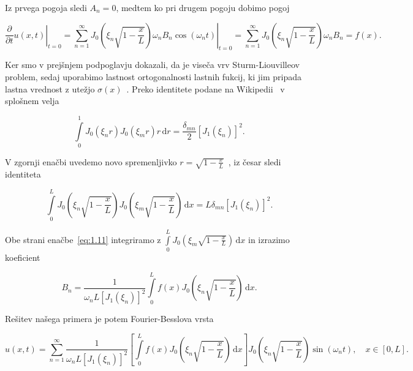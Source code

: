 Iz prvega pogoja sledi \( A_n = 0 \), medtem ko pri drugem pogoju dobimo pogoj

\begin{equation}
\label{eq:1.11}
 \left. \frac{\partial }{\partial t} u(x, t)\right|_{t = 0} = \left. \sum\limits_{n = 1}^{\infty} J_0 \left( \xi_n \sqrt{1 - \frac{x}{L}} \right) \omega_n B_n \cos \left( \omega_n t \right) \right|_{t= 0} = \sum\limits_{n = 1}^{\infty} J_0 \left( \xi_n \sqrt{1 - \frac{x}{L}} \right) \omega_n B_n = f(x).
\end{equation}

Ker smo v prejšnjem podpoglavju dokazali, da je viseča vrv Sturm-Liouvilleov problem, sedaj uporabimo lastnost ortogonalnosti lastnih fukcij, ki jim pripada lastna vrednost z utežjo \( \sigma(x) \)~\cite{haberman_applied_2004}. Preko identitete podane na Wikipedii~\cite{noauthor_fourierbessel_2026} v splošnem velja

\[\int\limits_0^1 J_0 (\xi_n r) J_0 (\xi_m r) r \, \mathrm{d} r = \frac{\delta_{mn}}{2} {\left[ J_1 (\xi_n) \right]}^2.
\]

V zgornji enačbi uvedemo novo spremenljivko \( r = \sqrt{1 - \frac{x}{L}} \)~\cite{dunaev_answer_2023}, iz česar sledi identiteta

\[ \int\limits_0^L J_0 \left( \xi_n \sqrt{1 -\frac{x}{L}} \right) J_0 \left( \xi_m \sqrt{1 - \frac{x}{L}} \right) \, \mathrm{d} x = L \delta_{mn} {\left[ J_1 (\xi_n) \right]}^2.
\]

Obe strani enačbe~\eqref{eq:1.11} integriramo z \( \int\limits_0^L J_0 \left(\xi_m \sqrt{1 - \frac{x}{L}}\right) \, \mathrm{d} x \) in izrazimo koeficient

\begin{equation}
\label{eq:1.13}
 B_n = \frac{1}{\omega_n L {\left[ J_1 (\xi_n) \right]}^2} \int\limits_0^L f(x) J_0 \left( \xi_n \sqrt{1 - \frac{x}{L}} \right) \, \mathrm{d} x. 
\end{equation}


Rešitev našega primera je potem Fourier-Besslova vrsta

\begin{equation}
\label{eq:1.12}
 u(x, t) = \sum\limits_{n = 1}^{\infty} \frac{1}{\omega_n L {\left[ J_1(\xi_n) \right]} ^2} \left[ \int\limits_0^{L} f(x) J_0 \left(\xi_n \sqrt{1 - \frac{x}{L}} \right) \, \mathrm{d} x \right] J_0 \left( \xi_n \sqrt{1 - \frac{x}{L}} \right) \sin \left( \omega_n t \right), \quad x \in [0, L].
\end{equation}


